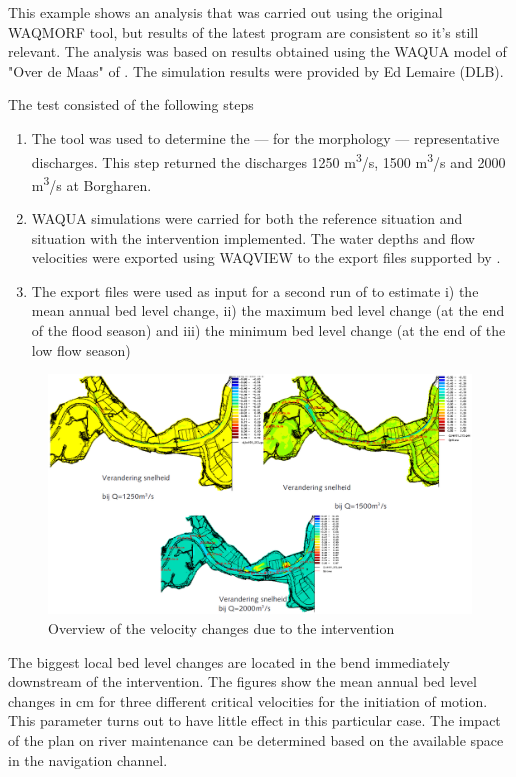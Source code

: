 This example shows an analysis that was carried out using the original WAQMORF tool, but results of the latest \dfastmi program are consistent so it's still relevant.
The analysis was based on results obtained using the WAQUA model of "Over de Maas" of \citep{Svasek2007}.
The simulation results were provided by Ed Lemaire (DLB).

The test consisted of the following steps

\begin{enumerate}
\item The tool \dfastmi was used to determine the --- for the morphology --- representative discharges.
This step returned the discharges 1250 m\textsuperscript{3}/s, 1500 m\textsuperscript{3}/s and 2000 m\textsuperscript{3}/s at Borgharen.

\item WAQUA simulations were carried for both the reference situation and situation with the intervention implemented.
The water depths and flow velocities were exported using WAQVIEW to the export files supported by \dfastmi.

\item The export files were used as input for a second run of \dfastmi to estimate i) the mean annual bed level change, ii) the maximum bed level change (at the end of the flood season) and iii) the minimum bed level change (at the end of the low flow season)
\end{enumerate}

\begin{figure}
\includegraphics[width=\columnwidth]{figures/Fig13.png}
\caption{Overview of the velocity changes due to the intervention}
\label{App.Fig13}
\end{figure}

The biggest local bed level changes are located in the bend immediately downstream of the intervention.
The figures show the mean annual bed level changes in cm for three different critical velocities for the initiation of motion.
This parameter turns out to have little effect in this particular case.
The impact of the plan on river maintenance can be determined based on the available space in the navigation channel.

